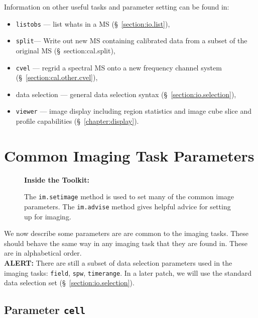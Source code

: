Information on other useful tasks and parameter setting can be found in:
\begin{itemize}
   \item {\tt listobs} --- list whats in a MS (\S~\ref{section:io.list}),
   \item {\tt split}--- Write out new MS containing calibrated data
      from a subset of the original MS (\S~{section:cal.split}),
   \item {\tt cvel} --- regrid a spectral MS onto a new frequency
      channel system
      (\S~\ref{section:cal.other.cvel}),
   \item data selection --- general data selection syntax
      (\S~\ref{section:io.selection}),
   \item {\tt viewer} --- image display including region statistics and
         image cube slice and profile capabilities
         (\S~\ref{chapter:display}).
\end{itemize}

\section{Common Imaging Task Parameters}
\label{section:im.pars}

\begin{wrapfigure}{r}{2.5in}
  \begin{boxedminipage}{2.5in}
     \centerline{\bf Inside the Toolkit:}
     The {\tt im.setimage} method is used to set many of the
     common image parameters.  The {\tt im.advise} method
     gives helpful advice for setting up for imaging.
  \end{boxedminipage}
\end{wrapfigure}

We now describe some parameters are are common to the imaging
tasks.  These should behave the same way in any imaging task
that they are found in.  These are in alphabetical order.\\[1cm]

{\bf ALERT:} There are still a subset of
data selection parameters used in the imaging tasks:
{\tt field}, {\tt spw}, {\tt timerange}.
In a later patch, we will use 
the standard data selection set (\S~\ref{section:io.selection}).

\subsection{Parameter {\tt cell} }
\label{section:im.pars.cell}

